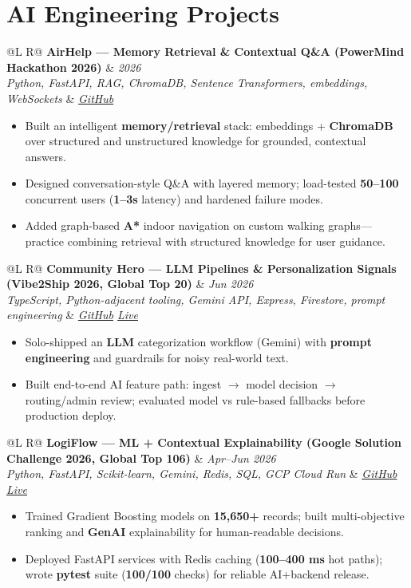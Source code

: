 \documentclass[a4paper,10pt]{article}
\makeatletter
\newcommand{\proj}[4]{%
  \vspace{1.2mm}
  \noindent\begin{tabularx}{\textwidth}{@{}L R@{}}
    \textbf{#1} & \textit{\small #2} \\
    \textit{\small #3} & \textit{\small #4} \\
  \end{tabularx}\par
  \vspace{0.4mm}%
}
\makeatother
\begin{document}
\section{AI Engineering Projects}
\proj{AirHelp --- Memory Retrieval \& Contextual Q\&A (PowerMind Hackathon 2026)}{2026}
{Python, FastAPI, RAG, ChromaDB, Sentence Transformers, embeddings, WebSockets}
{\href{https://github.com/Ojas-Srivastava05/AirHelp-AI-Airport-Assistant}{GitHub}}
\begin{itemize}
  \item Built an intelligent \textbf{memory/retrieval} stack: embeddings + \textbf{ChromaDB} over structured and unstructured knowledge for grounded, contextual answers.
  \item Designed conversation-style Q\&A with layered memory; load-tested \textbf{50--100} concurrent users (\textbf{1--3s} latency) and hardened failure modes.
  \item Added graph-based \textbf{A*} indoor navigation on custom walking graphs---practice combining retrieval with structured knowledge for user guidance.
\end{itemize}

\proj{Community Hero --- LLM Pipelines \& Personalization Signals (Vibe2Ship 2026, Global Top 20)}{Jun 2026}
{TypeScript, Python-adjacent tooling, Gemini API, Express, Firestore, prompt engineering}
{\href{https://github.com/Ojas-Srivastava05/community-hero}{GitHub} \textbar{} \href{https://community-hero-987477089222.asia-south1.run.app}{Live}}
\begin{itemize}
  \item Solo-shipped an \textbf{LLM} categorization workflow (Gemini) with \textbf{prompt engineering} and guardrails for noisy real-world text.
  \item Built end-to-end AI feature path: ingest $\rightarrow$ model decision $\rightarrow$ routing/admin review; evaluated model vs rule-based fallbacks before production deploy.
\end{itemize}

\proj{LogiFlow --- ML + Contextual Explainability (Google Solution Challenge 2026, Global Top 106)}{Apr--Jun 2026}
{Python, FastAPI, Scikit-learn, Gemini, Redis, SQL, GCP Cloud Run}
{\href{https://github.com/Ojas-Srivastava05/LogiFlow-Solution-Challenge-2026}{GitHub} \textbar{} \href{https://logi-flow-solution-challenge-2026.vercel.app}{Live}}
\begin{itemize}
  \item Trained Gradient Boosting models on \textbf{15,650+} records; built multi-objective ranking and \textbf{GenAI} explainability for human-readable decisions.
  \item Deployed FastAPI services with Redis caching (\textbf{100--400 ms} hot paths); wrote \textbf{pytest} suite (\textbf{100/100} checks) for reliable AI+backend release.
\end{itemize}
\end{document}
